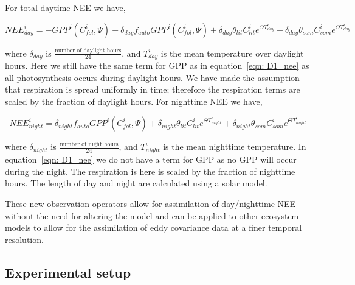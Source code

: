 \documentclass[draft,linenumbers]{agujournal}
\begin{document}
For total daytime NEE we have,
\begin{linenomath*}
\begin{equation}
NEE_{day}^{i} = -GPP^{i}(C_{fol}^{i}, \Psi) + \delta_{day}f_{auto}GPP^{i}(C_{fol}^{i}, \Psi) + \delta_{day}\theta_{lit}C_{lit}^i e^{\Theta T_{day}^{i}} + \delta_{day}\theta_{som}C_{som}^i e^{\Theta T_{day}^{i}} \label{eqn: D1_nee_day}
\end{equation}
\end{linenomath*}
where \(\delta_{day}\) is \(\frac{\text{number of daylight hours}}{24}\), and \(T_{day}^{i}\) is the mean temperature over daylight hours. Here we still have the same term for GPP as in equation~\eqref{eqn: D1_nee} as all photosynthesis occurs during daylight hours. We have made the assumption that respiration is spread uniformly in time; therefore the respiration terms are scaled by the fraction of daylight hours. For nighttime NEE we have,
\begin{linenomath*}
\begin{equation}
NEE_{night}^{i} =  \delta_{night}f_{auto}GPP^{i}(C_{fol}^{i}, \Psi) + \delta_{night}\theta_{lit}C_{lit}^i e^{\Theta T_{night}^{i}} + \delta_{night}\theta_{som}C_{som}^i e^{\Theta T_{night}^{i}} \label{eqn: D1_nee_night}
\end{equation}
\end{linenomath*}
where \(\delta_{night}\) is \(\frac{\text{number of night hours}}{24}\), and \(T_{night}^{i}\) is the mean nighttime temperature. In equation~\eqref{eqn: D1_nee} we do not have a term for GPP as no GPP will occur during the night. The respiration is here is scaled by the fraction of nighttime hours. The length of day and night are calculated using a solar model.

 These new observation operators allow for assimilation of day/nighttime NEE without the need for altering the model and can be applied to other ecosystem models to allow for the assimilation of eddy covariance data at a finer temporal resolution. 

\subsection{Experimental setup}

\end{document}
